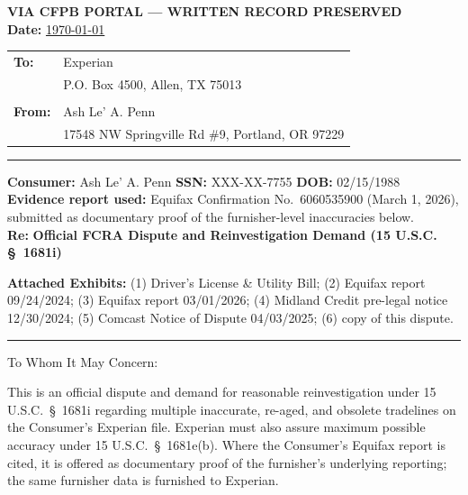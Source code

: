 \documentclass[12pt,letterpaper]{article}
\begin{document}
\begin{center}
  \textbf{VIA CFPB PORTAL --- WRITTEN RECORD PRESERVED} \\
  \textbf{Date:} \underline{\today}
\end{center}

\begin{tabular}{@{}ll}
  \textbf{To:}   & Experian \\
                 & P.O. Box 4500, Allen, TX 75013 \\
                 & \\
  \textbf{From:} & Ash Le' A. Penn \\
                 & 17548 NW Springville Rd \#9, Portland, OR 97229 \\
\end{tabular}

\vspace{1em}\hrule\vspace{1em}

\textbf{Consumer:} Ash Le' A. Penn \quad \textbf{SSN:} XXX-XX-7755 \quad \textbf{DOB:} 02/15/1988 \\
\textbf{Evidence report used:} Equifax Confirmation No.\ 6060535900 (March 1, 2026), submitted as documentary proof of the furnisher-level inaccuracies below. \\
\textbf{Re:} \textbf{Official FCRA Dispute and Reinvestigation Demand (15 U.S.C. \S~1681i)}

\vspace{1em}
\textbf{Attached Exhibits:} (1) Driver's License \& Utility Bill; (2) Equifax report 09/24/2024; (3) Equifax report 03/01/2026; (4) Midland Credit pre-legal notice 12/30/2024; (5) Comcast Notice of Dispute 04/03/2025; (6) copy of this dispute.

\vspace{1em}\hrule\vspace{1em}

To Whom It May Concern:

This is an official dispute and demand for reasonable reinvestigation under 15 U.S.C.\ \S~1681i regarding multiple inaccurate, re-aged, and obsolete tradelines on the Consumer's Experian file. Experian must also assure maximum possible accuracy under 15 U.S.C.\ \S~1681e(b). Where the Consumer's Equifax report is cited, it is offered as documentary proof of the furnisher's underlying reporting; the same furnisher data is furnished to Experian.


\end{document}
